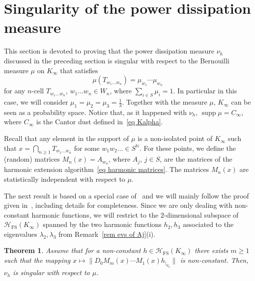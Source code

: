 \documentclass[11pt]{amsart}
\newtheorem{theorem}{Theorem}[section]
\theoremstyle{definition}
\theoremstyle{remark}
\theoremstyle{example}
\numberwithin{equation}{section}
\begin{document}
\section{Singularity of the power dissipation measure}
This section is devoted to proving that the power dissipation measure $\nu_h$ discussed in the preceding section is singular with respect to the Bernouilli measure $\mu$ on $K_\infty$ that satisfies
\[
\mu(T_{w_1\ldots w_n})=\mu_{w_1}\cdots\mu_{w_n}
\]
for any $n$-cell $T_{w_1\ldots w_n}$, $w_1\ldots w_n\in W_n$, where $\sum_{i\in S}\mu_i=1$. In particular in this case, we will consider $\mu_1=\mu_2=\mu_3=\frac{1}{3}$. Together with the measure $\mu$, $K_\infty$ can be seen as a probability space. Notice that, as it happened with $\nu_h$, ${\operatorname{supp}}\mu =C_\infty$, where $C_\infty$ is the Cantor dust defined in~\eqref{eq Kalpha}.

\medskip

Recall that any element in the support of $\mu$ is a non-isolated point of $K_\infty$ such that $x=\bigcap_{n\geq 1}T_{w_1\ldots w_n}$ for some $w_1w_2\ldots\in S^{{\mathbb N}}$. For these points, we define the (random) matrices $M_n(x)=A_{w_n}$, where $A_j$, $j\in S$, are the matrices of the harmonic extension algorithm~\eqref{eq harmonic matrices}. The matrices $M_n(x)$ are statistically independent with respect to $\mu$.

\medskip

The next result is based on a special case of~\cite{Kus89} and we will mainly follow the proof given in~\cite[Theorem 5.1]{BST99}, including details for completeness. Since we are only dealing with non-constant harmonic functions, we will restrict to the $2$-dimensional subspace of ${\mathcal{H}}_\operatorname{FS}(K_\infty)$ spanned by the two harmonic functions $h_2,h_3$ associated to the eigenvalues $\lambda_2,\lambda_3$ from Remark~\ref{rem evs of Aj}(i). 

\begin{theorem}\label{thm singularity of pd}
Assume that for a non-constant $h\in{\mathcal{H}}_\operatorname{FS}(K_\infty)$ there exists $m\geq 1$ such that the mapping $x\mapsto \|D_0M_m(x)\cdots M_1(x)h_{|_{V_0}}\|$ is non-constant. Then, $\nu_h$ is singular with respect to $\mu$.
\end{theorem}
\end{document}
